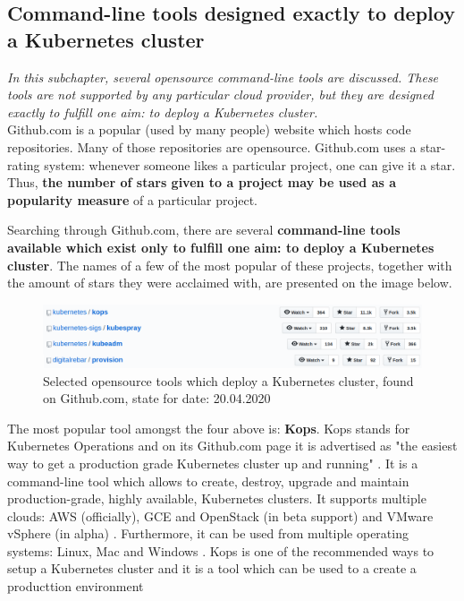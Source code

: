 \subsection{Command-line tools designed exactly to deploy a Kubernetes cluster}
\label{cli-tools-to-k8s}
\textit{In this subchapter, several opensource command-line tools are discussed. These tools are not supported by any particular cloud provider, but they are designed exactly to fulfill one aim: to deploy a Kubernetes cluster.}
\\

Github.com is a popular (used by many people) website which hosts code repositories. Many of those repositories are opensource.  Github.com uses a star-rating system: whenever someone likes a particular project, one can give it a star. Thus, \textbf{the number of stars given to a project may be used as a popularity measure} of a particular project.

Searching through Github.com, there are several \textbf{command-line tools available which exist only to fulfill one aim: to deploy a Kubernetes cluster}. The names of a few of the most popular of these projects, together with the amount of stars they were acclaimed with, are presented on the image below.

\begin{figure}[H]
    \centering
    \includegraphics[width=17cm]{figures/custom-tools.png}
    \captionsetup{justification=centering,margin=2cm}
    \caption{Selected opensource tools which deploy a Kubernetes cluster, found on Github.com, state for date: 20.04.2020}
\end{figure}

The most popular tool amongst the four above is: \textbf{Kops}. Kops stands for Kubernetes Operations and on its Github.com page it is advertised as "the easiest way to get a production grade Kubernetes cluster up and running" \cite{online-kops-gh}. It is a command-line tool which allows to create, destroy, upgrade and maintain production-grade, highly available, Kubernetes clusters. It supports multiple clouds: AWS (officially), GCE and OpenStack (in beta support) and VMware vSphere (in alpha) \cite{online-kops-gh}. Furthermore, it can be used from multiple operating systems: Linux, Mac and Windows \cite{online-kops-install}. Kops is one of the recommended ways to setup a Kubernetes cluster and it is a tool which can be used to a create a producttion environment \cite{book-devops-with-k8s}

